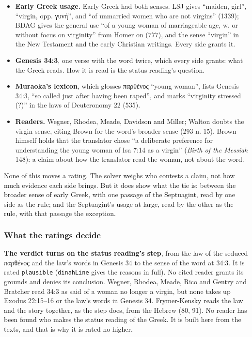 \documentclass[11pt]{article}
\begin{document}
\begin{itemize}
  \item \textbf{Early Greek usage.} Early Greek had both senses. LSJ gives “maiden, girl”, “virgin, opp. γυνή”, and “of unmarried women who are not virgins” (1339); BDAG gives the general use “of a young woman of marriageable age, w. or without focus on virginity” from Homer on (777), and the sense “virgin” in the New Testament and the early Christian writings. Every side grants it.
  \item \textbf{Genesis 34:3}, one verse with the word twice, which every side grants: what the Greek reads. How it is read is the status reading’s question.
  \item \textbf{Muraoka’s lexicon}, which glosses παρθένος “young woman”, lists Genesis 34:3, “so called just after having been raped”, and marks “virginity stressed (?)” in the laws of Deuteronomy 22 (535).
  \item \textbf{Readers.} Wegner, Rhodea, Meade, Davidson and Miller; Walton doubts the virgin sense, citing Brown for the word’s broader sense (293 n. 15). Brown himself holds that the translator chose “a deliberate preference for understanding the young woman of Isa 7:14 as a virgin” (\emph{Birth of the Messiah} 148): a claim about how the translator read the woman, not about the word.
\end{itemize}
None of this moves a rating. The solver weighs who contests a claim, not how much evidence each side brings. But it does show what the tie is: between the broader sense of early Greek, with one passage of the Septuagint, read by one side as the rule; and the Septuagint’s usage at large, read by the other as the rule, with that passage the exception.

\subsubsection*{What the ratings decide}
\textbf{The verdict turns on the status reading’s step}, from the law of the seduced παρθένος and the law’s words in Genesis 34 to the sense of the word at 34:3. It is rated \texttt{plausible} (\texttt{dinah\allowbreak{}Line} gives the reasons in full). No cited reader grants its grounds and denies its conclusion. Wegner, Rhodea, Meade, Rico and Gentry and Bratcher read 34:3 as said of a woman no longer a virgin, but none takes up Exodus 22:15–16 or the law’s words in Genesis 34. Frymer-Kensky reads the law and the story together, as the step does, from the Hebrew (80, 91). No reader has been found who makes the status reading of the Greek. It is built here from the texts, and that is why it is rated no higher.
\end{document}
